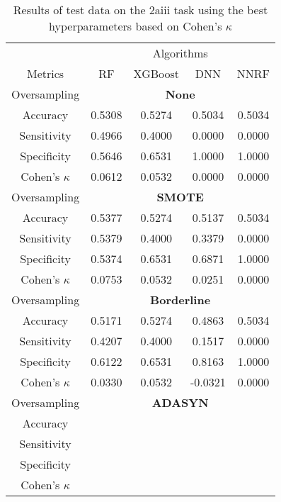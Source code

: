 \begin{table}[!htb]
\centering
\caption{Results of test data on the 2aiii task using the best hyperparameters based on Cohen's $\kappa$}
\label{tab:2aiii_test_results}
\begin{tabular}{c | c c c c}
\hline
    & \multicolumn{4}{c}{Algorithms}\\ 
Metrics &RF & XGBoost & DNN & NNRF\\ 
\hline
Oversampling &\multicolumn{4}{|c}{\textbf{None}}\\ 
\hline
Accuracy & 0.5308 & 0.5274 & 0.5034 & 0.5034\\ 
Sensitivity & 0.4966 & 0.4000 & 0.0000 & 0.0000\\ 
Specificity & 0.5646 & 0.6531 & 1.0000 & 1.0000\\ 
Cohen's $\kappa$ & 0.0612 & 0.0532 & 0.0000 & 0.0000\\ 
\hline
Oversampling &\multicolumn{4}{|c}{\textbf{SMOTE}}\\ 
\hline
Accuracy & 0.5377 & 0.5274 & 0.5137 & 0.5034\\ 
Sensitivity & 0.5379 & 0.4000 & 0.3379 & 0.0000\\ 
Specificity & 0.5374 & 0.6531 & 0.6871 & 1.0000\\ 
Cohen's $\kappa$ & 0.0753 & 0.0532 & 0.0251 & 0.0000\\ 
\hline
Oversampling &\multicolumn{4}{|c}{\textbf{Borderline}}\\ 
\hline
Accuracy & 0.5171 & 0.5274 & 0.4863 & 0.5034\\ 
Sensitivity & 0.4207 & 0.4000 & 0.1517 & 0.0000\\ 
Specificity & 0.6122 & 0.6531 & 0.8163 & 1.0000\\ 
Cohen's $\kappa$ & 0.0330 & 0.0532 & -0.0321 & 0.0000\\ 
\hline
Oversampling &\multicolumn{4}{|c}{\textbf{ADASYN}}\\ 
\hline
Accuracy &  &  &  & \\ 
Sensitivity &  &  &  & \\ 
Specificity &  &  &  & \\ 
Cohen's $\kappa$ &  &  &  & \\ 
\hline
\end{tabular}
\end{table}
